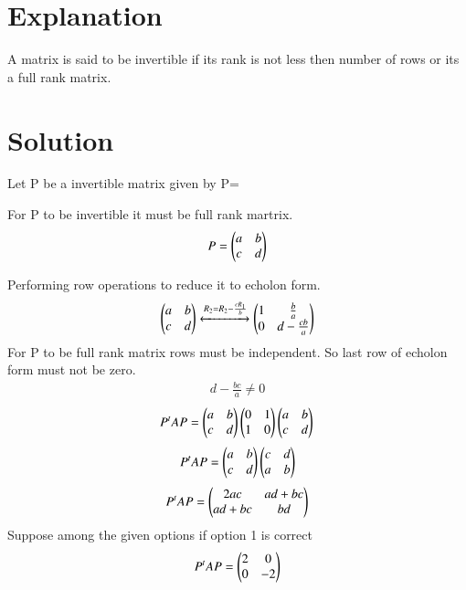 \documentclass[journal,12pt,twocolumn]{IEEEtran}
\begin{document}
\section{Explanation}
A matrix is said to be invertible if its rank is not less then number of rows or its a full rank matrix. 


\section{Solution}

Let P be a invertible matrix given by
P=

For P to be invertible it must be full rank martrix. 
\begin{align}
    P=\begin{pmatrix}a & b\\ c & d\end{pmatrix}
\end{align}

        
       Performing row operations to reduce it to echolon form.
       \begin{align}
    \begin{pmatrix}a & b\\ c & d\end{pmatrix} \xleftrightarrow{R_2 = R_2 - \frac{cR_1}{b}}\begin{pmatrix}1 & \frac{b}{a}\\ 0 & d-\frac{cb}{a}\end{pmatrix}
\end{align}
For P to be full rank matrix rows must be independent. So last row of echolon form must not be zero. 
\begin{align}
    d-\frac{bc}{a}\neq0
\end{align}
\begin{align}
 P^{t}AP=\myvec{a & b \\c & d }\myvec{0 & 1 \\1 & 0 }\myvec{a & b \\c & d }\newline
 \end{align}
 \begin{align}
 P^{t}AP=\begin{pmatrix}a & b \\c & d\end{pmatrix}\begin{pmatrix}c & d \\a & b \end{pmatrix} 
\end{align}
\begin{align}
 P^{t}AP=\begin{pmatrix}2ac & ad+bc \\ad+bc & bd\end{pmatrix} 
\end{align}
Suppose among the given options if option 1 is correct
\begin{align}
P^{t}AP=\begin{pmatrix}2 & 0 \\0 & -2 \end{pmatrix}
\end{align}
\end{document}
